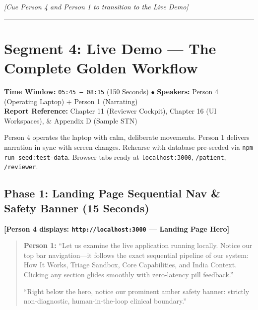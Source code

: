 \documentclass[11pt,a4paper]{article}
\begin{document}
\noindent \textit{[Cue Person 4 and Person 1 to transition to the Live Demo]}

\vspace{4mm}
\hrule
\vspace{6mm}

\section{Segment 4: Live Demo --- The Complete Golden Workflow}
\noindent \textbf{Time Window:} \texttt{05:45 -- 08:15} (150 Seconds) \quad $\bullet$ \quad \textbf{Speakers:} Person 4 (Operating Laptop) + Person 1 (Narrating)\\
\textbf{Report Reference:} Chapter 11 (Reviewer Cockpit), Chapter 16 (UI Workspaces), \& Appendix D (Sample STN)

\begin{stagenote}
Person 4 operates the laptop with calm, deliberate movements. Person 1 delivers narration in sync with screen changes. Rehearse with database pre-seeded via \texttt{npm run seed:test-data}. Browser tabs ready at \texttt{localhost:3000}, \texttt{/patient}, \texttt{/reviewer}.
\end{stagenote}

\subsection*{Phase 1: Landing Page Sequential Nav \& Safety Banner (15 Seconds)}
\noindent \textbf{[Person 4 displays: \texttt{http://localhost:3000} --- Landing Page Hero]}
\begin{quote}
\textbf{Person 1:} ``Let us examine the live application running locally. Notice our top bar navigation---it follows the exact sequential pipeline of our system: How It Works, Triage Sandbox, Core Capabilities, and India Context. Clicking any section glides smoothly with zero-latency pill feedback.''

``Right below the hero, notice our prominent amber safety banner: strictly non-diagnostic, human-in-the-loop clinical boundary.''
\end{quote}
\end{document}
